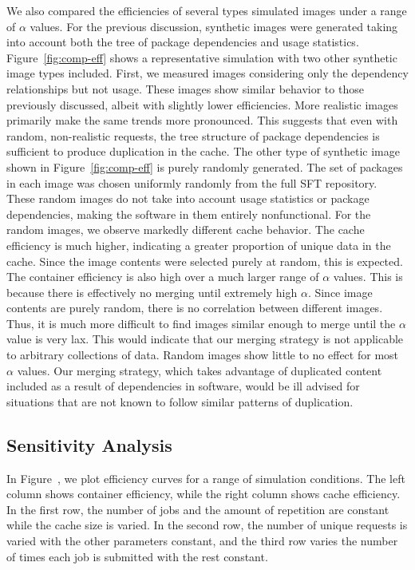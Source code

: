 \documentclass[sigconf]{acmart}
\begin{document}
We also compared the efficiencies of several types simulated images under a range of $\alpha$ values.
For the previous discussion, synthetic images were generated taking into account both the tree of package dependencies and usage statistics.
Figure~\ref{fig:comp-eff} shows a representative simulation with two other synthetic image types included.
First, we measured images considering only the dependency relationships but not usage.
These images show similar behavior to those previously discussed,
albeit with slightly lower efficiencies.
More realistic images primarily make the same trends more pronounced.
This suggests that even with random, non-realistic requests,
the tree structure of package dependencies is sufficient to produce duplication in the cache.
The other type of synthetic image shown in Figure~\ref{fig:comp-eff} is purely randomly generated.
The set of packages in each image was chosen uniformly randomly from the full SFT repository.
These random images do not take into account usage statistics or package dependencies,
making the software in them entirely nonfunctional.
For the random images,
we observe markedly different cache behavior.
The cache efficiency is much higher,
indicating a greater proportion of unique data in the cache.
Since the image contents were selected purely at random,
this is expected.
The container efficiency is also high over a much larger range of $\alpha$ values.
This is because there is effectively no merging until extremely high $\alpha$.
Since image contents are purely random,
there is no correlation between different images.
Thus, it is much more difficult to find images similar enough to merge until the $\alpha$ value is very lax.
This would indicate that our merging strategy is not applicable to arbitrary collections of data.
Random images show little to no effect for most $\alpha$ values.
Our merging strategy, which takes advantage of duplicated content included as a result of dependencies in software,
would be ill advised for situations that are not known to follow similar patterns of duplication.

\subsection{Sensitivity Analysis}
\label{sec:sensitivity}

    
    In Figure~, we plot efficiency curves for a range of simulation conditions.
The left column shows container efficiency,
while the right column shows cache efficiency.
In the first row, the number of jobs and the amount of repetition are constant while the cache size is varied.
In the second row, the number of unique requests is varied with the other parameters constant,
and the third row varies the number of times each job is submitted with the rest constant.
\end{document}
